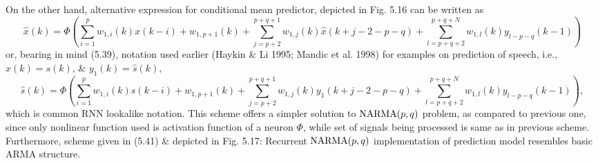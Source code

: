 \documentclass{article}
\begin{document}
\begin{enumerate}
\begin{itemize}
\begin{itemize}
			On the other hand, alternative expression for conditional mean predictor, depicted in Fig. 5.16 can be written as
			\begin{equation}
				\hat{x}(k) = \Phi\left(\sum_{i=1}^p w_{1,i}(k)x(k - i) + w_{1,p+1}(k) + \sum_{j = p + 2}^{p + q + 1} w_{1,j}(k)\hat{x}(k + j - 2 -  p - q) + \sum_{l = p + q + 2}^{p + q  + N} w_{1,l}(k)y_{l - p - q}(k - 1)\right)
			\end{equation}
			or, bearing in mind (5.39), notation used earlier (Haykin \& Li 1995; Mandic et al. 1998) for examples on prediction of speech, i.e., $x(k) = s(k)$, \& $y_1(k) = \hat{s}(k)$,
			\begin{equation}
				\hat{s}(k) = \Phi\left(\sum_{i=1}^p w_{1,i}(k)s(k - i) + w_{1,p+1}(k) + \sum_{j = p + 2}^{p + q + 1} w_{1,j}(k)y_1(k + j - 2 - p - q) + \sum_{l = p + q + 2}^{p + q + N} w_{1,l}(k)y_{l - p - q}(k - 1)\right),
			\end{equation}
			which is common RNN lookalike notation. This scheme offers a simpler solution to ${\rm NARMA}(p,q)$ problem, as compared to previous one, since only nonlinear function used is activation function of a neuron $\Phi$, while set of signals being processed is same as in previous scheme. Furthermore, scheme given in (5.41) \& depicted in {\sf Fig. 5.17: Recurrent ${\rm NARMA}(p,q)$ implementation of prediction model} resembles basic ARMA structure.
			

\end{itemize}
\end{itemize}
\end{enumerate}
\end{document}
